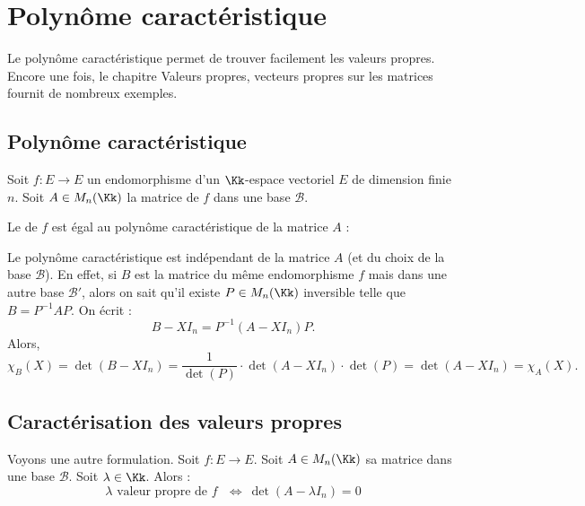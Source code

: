 \documentclass[12pt, class=report,crop=false]{standalone}
\begin{document}
\section{Polynôme caractéristique}

Le polynôme caractéristique permet de trouver facilement les valeurs propres.
Encore une fois, le chapitre \og{}Valeurs propres, vecteurs propres\fg{}
sur les matrices fournit de nombreux exemples.


\subsection{Polynôme caractéristique}


\begin{definition}
Soit $f : E \to E$ un endomorphisme d'un $\Kk$-espace vectoriel $E$ de dimension finie $n$.
Soit $A\in M_n(\Kk)$ la matrice de $f$ dans une base $\mathcal{B}$.

Le  de $f$ est égal au polynôme caractéristique de la matrice $A$ :
\end{definition}

Le polynôme caractéristique est indépendant de la matrice $A$ (et du choix de la base $\mathcal{B}$).
En effet, si $B$ est la matrice du même endomorphisme $f$ mais dans une autre base $\mathcal{B}'$, alors on sait qu'il existe $P \in M_n(\Kk)$ inversible telle que $B = P^{-1}AP$.
On écrit :
$$B-XI_n = P^{-1}(A-XI_n)P.$$
Alors, 
$$\chi_B(X) 
= \det(B-XI_n)
= \frac{1}{\det(P)} \cdot \det(A-XI_n) \cdot \det(P)
= \det(A-XI_n) 
= \chi_A(X).$$



\subsection{Caractérisation des valeurs propres}

\begin{proposition}
\sauteligne
\label{prop:diagonvpcarac}
\end{proposition}

Voyons une autre formulation.
Soit $f : E \to E$. Soit $A \in M_n(\Kk)$ sa matrice dans une base $\mathcal{B}$.
Soit $\lambda \in \Kk$. Alors :
\[\lambda \text{ valeur propre de $f$ } \iff \ \det (A-\lambda I_n) = 0\]
\end{document}
